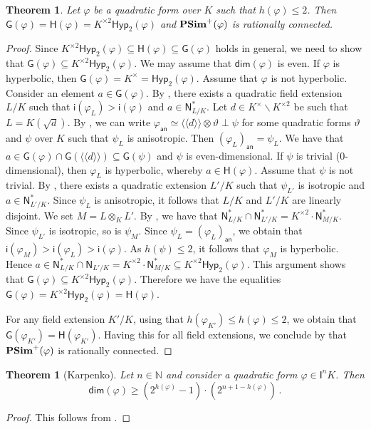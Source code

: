 \documentclass[twoside,11pt]{amsart}
\numberwithin{equation}{section}
\newtheorem{thm}[equation]{Theorem}
\theoremstyle{definition}
\renewcommand{\dim}{\operatorname{\mathsf{dim}}}
\newcommand\N{\operatorname{N}}
\newcommand{\vf}{\varphi}
\newcommand{\mg}[1]{{#1}^{\times}}
\newcommand{\sq}[1]{{#1}^{\times 2}}
\newcommand{\nat}{\mathbb{N}}
\newcommand{\la}{\langle}
\newcommand{\ra}{\rangle}
\newcommand{\lla}{\la\!\la}
\newcommand{\rra}{\ra\!\ra}
\newcommand{\an}{\mathsf{an}}
\renewcommand{\leq}{\leqslant}
\renewcommand{\geq}{\geqslant}
\newcommand{\I}{\mathsf{I}}
\renewcommand{\N}{\mathsf{N}}
\newcommand{\G}{\mathsf{G}}
\renewcommand{\H}{\mathsf{H}}
\newcommand{\Hyp}{\mathsf{Hyp}}
\renewcommand{\setminus}{\smallsetminus}
\renewcommand{\dim}{\mathsf{dim}}
\renewcommand{\leq}{\leqslant}
\renewcommand{\geq}{\geqslant}
\newcommand{\wi}{\mathsf{i}}
\renewcommand{\setminus}{\smallsetminus}
\begin{document}
\begin{thm}\label{h2ratcon}
    Let $\vf$ be a quadratic form over $K$ such that $h(\vf)\leq 2$.
    Then $\G(\vf)=\H(\vf)=\sq{K}\Hyp_2(\vf)$ and ${\rm\bf PSim}^+(\vf)$ is rationally connected.
\end{thm}
\begin{proof}
    Since $\sq{K}\Hyp_2(\vf)\subseteq\H(\vf)\subseteq \G(\vf)$ holds in general, we need to show that $\G(\varphi)\subseteq\sq{K}\Hyp_2(\vf)$.
    We may assume that $\dim(\vf)$ is even. 
    If $\vf$ is hyperbolic, then $\G(\vf)=\mg{K}=\Hyp_2(\vf)$. Assume that $\vf$ is not hyperbolic.
    Consider an element $a\in\G(\vf)$. 
    By , there exists a quadratic field extension $L/K$ such that  $\wi(\vf_L)>\wi(\vf)$ and $a\in\N_{L/K}^\ast$.
    Let $d\in\mg{K}\setminus\sq{K}$ be such that $L=K(\sqrt{d})$.
    By \cite[Cor.~22.12]{EKM08}, we can write $\vf_\an\simeq \lla d\rra\otimes \vartheta\perp\psi$ for some quadratic forms $\vartheta$ and $\psi$ over $K$ such that $\psi_L$ is anisotropic. Then $(\vf_L)_\an=\psi_L$.
    We have that $a\in\G(\vf)\cap\G(\lla d\rra)\subseteq\G(\psi)$ and $\psi$ is even-dimensional.
    If $\psi$ is trivial ($0$-dimensional), then $\vf_L$ is hyperbolic, whereby $a\in\H(\vf)$.
    Assume that $\psi$ is not trivial.
    By , there exists a quadratic extension $L'/K$ such that $\psi_{L'}$ is isotropic and $a\in\N_{L'/K}^\ast$.
    Since $\psi_{L}$ is anisotropic, it follows that $L/K$ and $L'/K$ are linearly disjoint.
    We set $M=L\otimes_KL'$.
    By , we have that $\N_{L/K}^\ast\cap\N_{L'/K}^\ast=\sq{K}\cdot\N_{M/K}^\ast$.
    Since $\psi_{L'}$ is isotropic, so is $\psi_M$.
    Since $\psi_L=(\vf_L)_\an$, we obtain that $\wi(\vf_M)>\wi(\vf_L)>\wi(\vf)$.
    As $h(\psi)\leq 2$, it follows that $\vf_M$ is hyperbolic.
    Hence 
    $a\in\N_{L/K}^\ast\cap\N_{L'/K}=\sq{K}\cdot\N_{M/K}^\ast\subseteq\sq{K}\Hyp_2(\vf)$.
    This argument shows that $\G(\varphi)\subseteq \sq{K}\Hyp_2(\vf)$.
Therefore we have the equalities $\G(\varphi)=\sq{K}\Hyp_2(\vf)=\H(\varphi)$.
    

For any field extension $K'/K$, using that $h(\varphi_{K'})\leq h(\vf)\leq 2$, we obtain that $\G(\varphi_{K'})=\H(\varphi_{K'})$. 
Having this for all field extensions, we conclude by  that ${\bf PSim}^+(\vf)$ is rationally connected.
\end{proof}

\begin{thm}[Karpenko]\label{T:Karpenko}
    Let $n\in\nat$ and consider a quadratic form $\varphi\in\I^nK$.
    Then 
    $$\dim(\varphi)\geq (2^{h(\varphi)}-1)\cdot (2^{n+1-h(\varphi)})\,.$$
\end{thm}
\begin{proof}
    This follows from \cite[Cor.~6.2]{Kar04}.
\end{proof}
\end{document}
